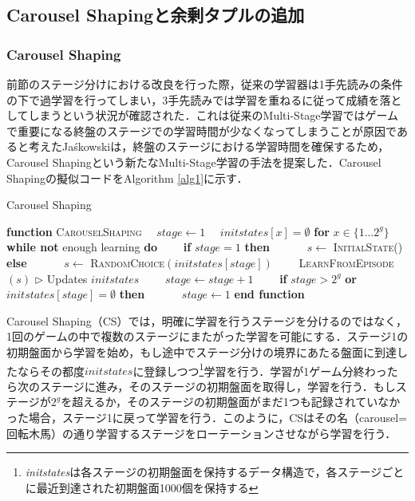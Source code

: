 \documentclass{suribt}
\begin{document}
\subsection{Carousel Shapingと余剰タプルの追加}
\subsubsection{Carousel Shaping}
前節のステージ分けにおける改良を行った際，従来の学習器は1手先読みの条件の下で過学習を行ってしまい，3手先読みでは学習を重ねるに従って成績を落としてしまうという状況が確認された．これは従来のMulti-Stage学習ではゲームで重要になる終盤のステージでの学習時間が少なくなってしまうことが原因であると考えたJa\'{s}kowskiは，終盤のステージにおける学習時間を確保するため，Carousel Shapingという新たなMulti-Stage学習の手法を提案した．Carousel Shapingの擬似コードをAlgorithm \ref{alg1}に示す．

\begin{algorithm}
\caption{Carousel Shaping}
\label{alg1}
\begin{algorithmic}[1]
\STATE \textbf{function} \textsc{CarouselShaping}
\STATE 　$stage \leftarrow 1$
\STATE 　$initstates[x] = \emptyset$ \textbf{for} $x \in \{1...2^g\}$
\STATE 　\textbf{while not} enough learning \textbf{do}
\STATE 　　\textbf{if} $stage = 1$ \textbf{then}
\STATE 　　　$s \leftarrow$ \textsc{InitialState()}
\STATE 　　\textbf{else}
\STATE 　　　$s \leftarrow$ \textsc{RandomChoice}$(initstates[stage])$
\STATE 　　\textsc{LearnFromEpisode}$(s)$ $\triangleright$ Updates $initstates$
\STATE 　　$stage \leftarrow stage + 1$
\STATE 　　\textbf{if} $stage > 2^g$ \textbf{or} $initstates[stage] = \emptyset$ \textbf{then}
\STATE 　　　$stage \leftarrow 1$
\STATE \textbf{end function}
\end{algorithmic}
\end{algorithm}

Carousel Shaping（CS）では，明確に学習を行うステージを分けるのではなく，1回のゲームの中で複数のステージにまたがった学習を可能にする．ステージ1の初期盤面から学習を始め，もし途中でステージ分けの境界にあたる盤面に到達したならその都度$initstates$に登録しつつ\footnote{\textit{initstates}は各ステージの初期盤面を保持するデータ構造で，各ステージごとに最近到達された初期盤面1000個を保持する}学習を行う．学習が1ゲーム分終わったら次のステージに進み，そのステージの初期盤面を取得し，学習を行う．もしステージが$2^g$を超えるか，そのステージの初期盤面がまだ1つも記録されていなかった場合，ステージ1に戻って学習を行う．このように，CSはその名（carousel=回転木馬）の通り学習するステージをローテーションさせながら学習を行う．
\end{document}
